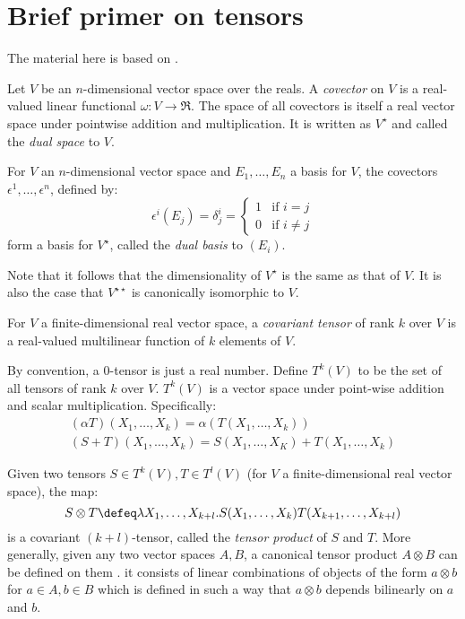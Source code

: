 \section{Brief primer on tensors}\label{sec:tensor}
The material here is based on \cite{lee-book-2000,dullemond-1991-tensor}.


Let \(V\) be an \(n\)-dimensional vector space over the reals. A {\em covector} on \(V\) is a real-valued linear functional \(\omega:V\rightarrow \Re\). The space of all covectors is itself a real vector space  under pointwise addition and multiplication. It is written as \(V^{\star}\) and called the {\em dual space} to \(V\). 

\begin{proposition} For \(V\) an \(n\)-dimensional vector space and \(E_1, \ldots, E_n\) a basis for \(V\), the covectors \(\epsilon^1, \ldots, \epsilon^n\), defined by:
  \[
  \epsilon^i(E_j) = \delta^i_j = \left\{
  \begin{array}{ll}
    1 & \mbox{if \(i =j\)} \\
    0 & \mbox{if \(i\not=j\)}
    \end{array}\right.
    \]
\noindent form a basis for \(V^{\star}\), called the {\em dual basis} to \((E_i)\).   
\end{proposition}
Note that it follows that the dimensionality of \(V^{\star}\) is the same as that of \(V\). It is also the case that \(V^{\star\star}\) is canonically isomorphic to \(V\). 


\begin{definition} For $V$ a finite-dimensional real vector space, a {\em covariant tensor} of rank $k$ over $V$ is a real-valued multilinear function of $k$ elements of $V$.
\end{definition}

By convention, a $0$-tensor is just a real number. Define $T^k(V)$ to be the set of all tensors of rank $k$ over $V$. $T^k(V)$ is a vector space under point-wise addition and scalar multiplication. Specifically:
\[
\begin{array}{l}
  (\alpha T)(X_1, \ldots, X_k) = \alpha(T(X_1, \ldots, X_k))\\
  (S+T)(X_1, \ldots, X_k)=S(X_1, \ldots, X_K) + T(X_1, \ldots, X_k)
\end{array}
\]

Given two tensors \(S \in T^k(V), T \in T^l(V)\) (for \(V\) a finite-dimensional real vector space), the map:
\[ S \otimes T \defeq \lambda X_1, \ldots, X_{k+l}.S(X_1,\ldots, X_k)T(X_{k+1}, \ldots, X_{k+l})\]
\noindent is a covariant \((k+l)\)-tensor, called the {\em tensor product} of \(S\) and \(T\). More generally, given any two vector spaces \(A,B\), a canonical tensor product \(A\otimes B\) can be defined on them \cite[P.~175]{lee-book-2000}. it consists of linear combinations of objects of the form \(a\otimes b\) for \(a\in A, b\in B\) which is defined in such a way that \(a\otimes b\) depends bilinearly on \(a\) and \(b\). 


